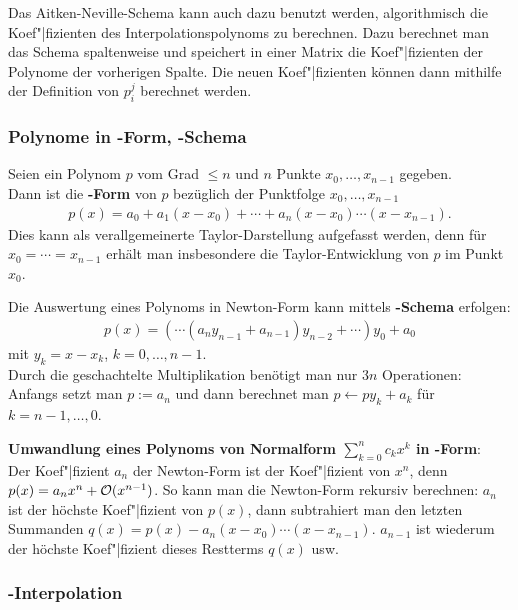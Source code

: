 Das Aitken-Neville-Schema kann auch dazu benutzt werden, algorithmisch
die Koef"|fizienten des Interpolationspolynoms zu berechnen.
Dazu berechnet man das Schema spaltenweise und speichert in einer Matrix
die Koef"|fizienten der Polynome der vorherigen Spalte.
Die neuen Koef"|fizienten können dann mithilfe der Definition von $p_i^j$
berechnet werden.

\subsubsection{%
    Polynome in -Form, -Schema%
}

Seien ein Polynom $p$ vom Grad $\le n$ und $n$ Punkte $x_0, \dotsc, x_{n-1}$
gegeben. \\
Dann ist die \textbf{-Form} von $p$ bezüglich der Punktfolge
$x_0, \dotsc, x_{n-1}$
\begin{align*}
    p(x) = a_0 + a_1 (x - x_0) + \dotsb + a_n (x - x_0) \dotsm (x - x_{n-1}).
\end{align*}
Dies kann als verallgemeinerte Taylor-Darstellung aufgefasst werden, denn
für $x_0 = \dotsb = x_{n-1}$ erhält man insbesondere die Taylor-Entwicklung
von $p$ im Punkt $x_0$.

\linie

Die Auswertung eines Polynoms in Newton-Form kann mittels
\textbf{-Schema} erfolgen:
\begin{align*}
    p(x) = (\dotsb(a_n y_{n-1} + a_{n-1}) y_{n-2} + \dotsb) y_0 + a_0
\end{align*}
mit $y_k = x - x_k$, $k = 0, \dotsc, n - 1$. \\
Durch die geschachtelte Multiplikation benötigt man nur $3n$ Operationen: \\
Anfangs setzt man $p := a_n$ und dann berechnet man
$p \leftarrow p y_k + a_k$ für $k = n - 1, \dotsc, 0$.

\linie

\textbf{Umwandlung eines Polynoms von Normalform $\sum_{k=0}^n c_k x^k$ in
-Form}: \\
Der Koef"|fizient $a_n$ der Newton-Form ist der Koef"|fizient von $x^n$,
denn $p(x) = a_n x^n + \mathcal{O}(x^{n-1})$.
So kann man die Newton-Form rekursiv berechnen:
$a_n$ ist der höchste Koef"|fizient von $p(x)$, dann subtrahiert man
den letzten Summanden $q(x) = p(x) - a_n (x - x_0) \dotsm (x - x_{n-1})$.
$a_{n-1}$ ist wiederum der höchste Koef"|fizient dieses Restterms $q(x)$ usw.

\subsubsection{%
    -Interpolation%
}


